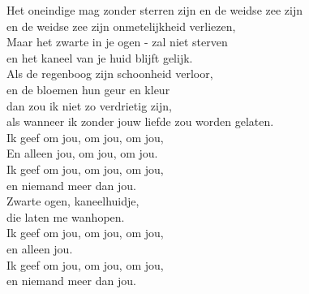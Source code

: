 \begin{translation}
Het oneindige mag zonder sterren zijn en de weidse zee zijn\\
en de weidse zee zijn onmetelijkheid verliezen,\\
Maar het zwarte in je ogen - zal niet sterven\\
en het kaneel van je huid blijft gelijk.\\
\vspace*{1\baselineskip}
Als de regenboog zijn schoonheid verloor,\\
en de bloemen hun geur en kleur\\
dan zou ik niet zo verdrietig zijn,\\
als wanneer ik zonder jouw liefde zou worden gelaten.\\
Ik geef om jou, om jou, om jou,\\
En alleen jou, om jou, om jou.\\
Ik geef om jou, om jou, om jou,\\
en niemand meer dan jou.\\
\vspace*{1\baselineskip}
Zwarte ogen, kaneelhuidje,\\
die laten me wanhopen.\\
Ik geef om jou, om jou, om jou,\\
en alleen jou.\\
Ik geef om jou, om jou, om jou,\\
en niemand meer dan jou. 
\end{translation}
